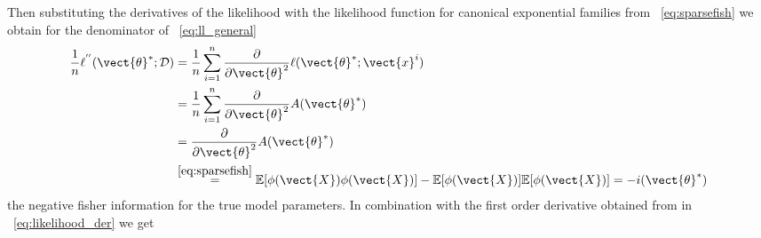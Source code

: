       Then substituting the derivatives of the likelihood with the likelihood function for canonical exponential families from \eq~\ref{eq:sparsefish} we obtain for the denominator of \eq~\ref{eq:ll_general}
      \begin{equation}
        \begin{split}
        \frac{1}{n}\ell^{''}(\vect{\theta}^*; \mathcal{D}) &= \frac{1}{n} \sum_{i=1}^n \frac{\partial}{\partial \vect{\theta}^2} \ell (\vect{\theta}^*; \vect{x}^i)\\
        &= \frac{1}{n} \sum_{i=1}^n \frac{\partial}{\partial \vect{\theta}^2} A(\vect{\theta}^*)\\
        & = \frac{\partial}{\partial \vect{\theta}^2}  A(\vect{\theta}^*)  \\
        &\stackrel{\ref{eq:sparsefish}}{=} \mathbb{E}[\phi(\vect{X}) \phi(\vect{X})] - \mathbb{E}[\phi(\vect{X})] \mathbb{E}[\phi(\vect{X})] = - i(\vect{\theta}^*)
        \end{split}
      \end{equation}
      the negative fisher information for the true model parameters.
      In combination with the first order derivative obtained from in \eq~\ref{eq:likelihood_der} we get 
